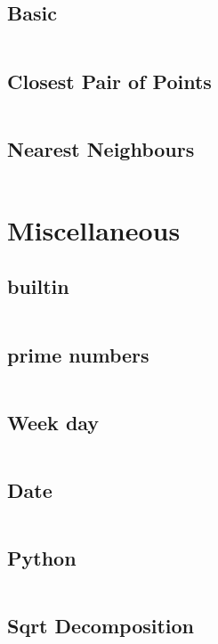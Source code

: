 \documentclass[a4paper, 10pt, twocolumn, landscape]{article}
\begin{document}
  \subsection{Basic}
  \inputminted{cpp}{geometry/basics.cpp}
  \subsection{Closest Pair of Points}
  \inputminted{cpp}{geometry/closest-pair.cpp}
  \subsection{Nearest Neighbours}
  \inputminted{cpp}{geometry/neighbour.cpp}

  \section{Miscellaneous}
  \subsection{builtin}
  \inputminted{cpp}{misc/builtin.cpp}
  \subsection{prime numbers}
  \inputminted{text}{misc/prime-numbers.txt}
  \subsection{Week day}
  \inputminted{cpp}{misc/week-day.cpp}
  \subsection{Date}
  \inputminted{cpp}{misc/date.cpp}
  \subsection{Python}
  \inputminted{cpp}{misc/python.py}
  \subsection{Sqrt Decomposition}
  \inputminted{cpp}{misc/sqrt-decomposition.cpp}
\end{document}
